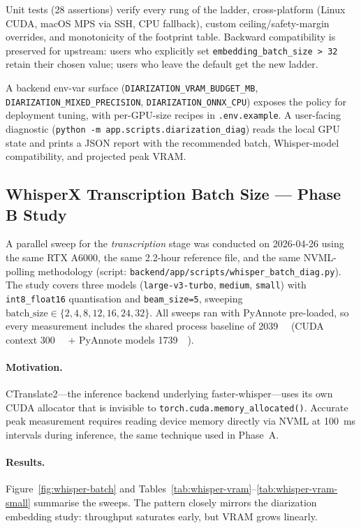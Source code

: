 \documentclass[conference,10pt]{IEEEtran}
\begin{document}
Unit tests (28 assertions) verify every rung of the ladder,
cross-platform (Linux CUDA, macOS MPS via SSH, CPU fallback), custom
ceiling/safety-margin overrides, and monotonicity of the footprint
table. Backward compatibility is preserved for upstream: users who
explicitly set \texttt{embedding\_batch\_size > 32} retain their
chosen value; users who leave the default get the new ladder.

A backend env-var surface
(\texttt{DIARIZATION\_VRAM\_BUDGET\_MB},
\texttt{DIARIZATION\_MIXED\_PRECISION},
\texttt{DIARIZATION\_ONNX\_CPU}) exposes the policy for deployment
tuning, with per-GPU-size recipes in
\texttt{.env.example}. A user-facing diagnostic
(\texttt{python -m app.scripts.diarization\_diag}) reads the local
GPU state and prints a JSON report with the recommended batch,
Whisper-model compatibility, and projected peak VRAM.

\subsection{WhisperX Transcription Batch Size --- Phase B Study}
\label{sec:whisper-batch}

A parallel sweep for the \textit{transcription} stage was conducted on
2026-04-26 using the same RTX A6000, the same 2.2-hour reference file,
and the same NVML-polling methodology (script:
\texttt{backend/app/scripts/whisper\_batch\_diag.py}).  The study
covers three models (\texttt{large-v3-turbo}, \texttt{medium},
\texttt{small}) with \texttt{int8\_float16} quantisation
and \texttt{beam\_size=5}, sweeping
$\text{batch\_size} \in \{2, 4, 8, 12, 16, 24, 32\}$.
All sweeps ran with PyAnnote pre-loaded, so every measurement
includes the shared process baseline of \SI{2039}{\mega\byte}
(CUDA context \SI{300}{\mega\byte} + PyAnnote models
\SI{1739}{\mega\byte}).

\paragraph{Motivation.}
CTranslate2---the inference backend underlying faster-whisper---uses its
own CUDA allocator that is invisible to
\texttt{torch.cuda.memory\_allocated()}.  Accurate peak measurement
requires reading device memory directly via NVML at \SI{100}{\milli\second}
intervals during inference, the same technique used in Phase~A.

\paragraph{Results.}
Figure~\ref{fig:whisper-batch} and Tables~\ref{tab:whisper-vram}--\ref{tab:whisper-vram-small}
summarise the sweeps.  The pattern closely mirrors the diarization
embedding study: throughput saturates early, but VRAM grows linearly.
\end{document}
